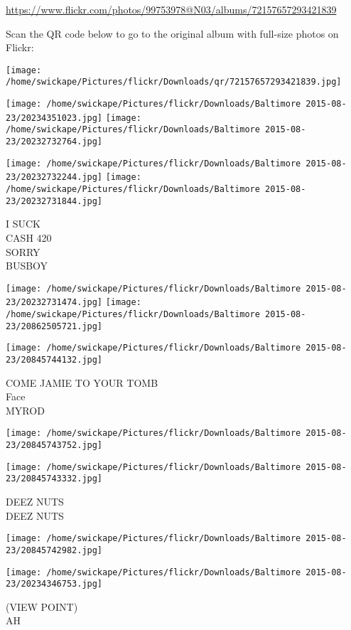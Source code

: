 \documentclass[10pt,letterpaper]{article}
\begin{document}
\url{https://www.flickr.com/photos/99753978@N03/albums/72157657293421839}

Scan the QR code below to go to the original album with full-size photos on Flickr:

\texttt{[image: /home/swickape/Pictures/flickr/Downloads/qr/72157657293421839.jpg]}
\pagebreak

\texttt{[image: /home/swickape/Pictures/flickr/Downloads/Baltimore 2015-08-23/20234351023.jpg]}
\texttt{[image: /home/swickape/Pictures/flickr/Downloads/Baltimore 2015-08-23/20232732764.jpg]}

\texttt{[image: /home/swickape/Pictures/flickr/Downloads/Baltimore 2015-08-23/20232732244.jpg]}
\texttt{[image: /home/swickape/Pictures/flickr/Downloads/Baltimore 2015-08-23/20232731844.jpg]}

I SUCK\\
CASH 420\\
SORRY\\
BUSBOY
\pagebreak

\texttt{[image: /home/swickape/Pictures/flickr/Downloads/Baltimore 2015-08-23/20232731474.jpg]}
\texttt{[image: /home/swickape/Pictures/flickr/Downloads/Baltimore 2015-08-23/20862505721.jpg]}

\texttt{[image: /home/swickape/Pictures/flickr/Downloads/Baltimore 2015-08-23/20845744132.jpg]}

COME JAMIE TO YOUR TOMB\\
Face\\
MYROD
\pagebreak

\texttt{[image: /home/swickape/Pictures/flickr/Downloads/Baltimore 2015-08-23/20845743752.jpg]}

\vspace{0.25in}
\texttt{[image: /home/swickape/Pictures/flickr/Downloads/Baltimore 2015-08-23/20845743332.jpg]}

DEEZ NUTS\\
DEEZ NUTS
\pagebreak

\texttt{[image: /home/swickape/Pictures/flickr/Downloads/Baltimore 2015-08-23/20845742982.jpg]}

\vspace{0.25in}
\texttt{[image: /home/swickape/Pictures/flickr/Downloads/Baltimore 2015-08-23/20234346753.jpg]}

(VIEW POINT)\\
AH
\pagebreak
\end{document}
